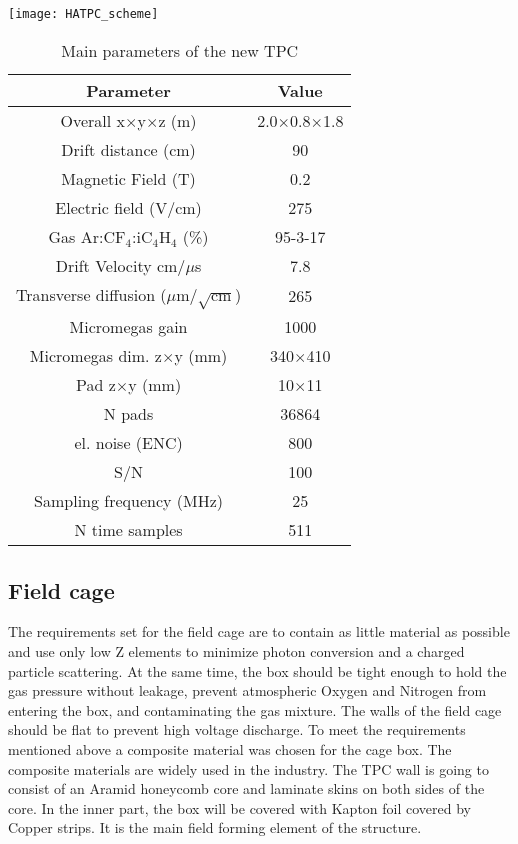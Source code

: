 \documentclass[../main.tex]{subfiles}
\begin{document}
\begin{table}
\begin{minipage}[!ht]{0.49\linewidth}
  \texttt{[image: HATPC\_scheme]}
  \label{fig:up:tpc_s}
\end{minipage}
\hfill
\begin{minipage}[!ht]{0.49\linewidth}
  \begin{tabular}{|c|c|}
    \hline
    Parameter             & Value \\
    \hline
    Overall x$\times$y$\times$z (m)   & 2.0$\times$0.8$\times$1.8 \\
    Drift distance (cm)               & 90 \\
    Magnetic Field (T)                & 0.2 \\
    Electric field (V/cm)             & 275 \\
    Gas $\text{Ar:CF}_4\text{:iC}_4\text{H}_4$ (\%)            & 95-3-17 \\
    Drift Velocity cm/$\mu$s          & 7.8 \\
    Transverse diffusion ($\mu$m/$\sqrt{\text{cm}}$) & 265 \\
    Micromegas gain                   & 1000 \\
    Micromegas dim. z$\times$y (mm)   & 340$\times$410 \\
    Pad z$\times$y (mm) & 10$\times$11 \\
    N pads                            & 36864 \\
    el. noise (ENC)                   & 800 \\
    S/N                               & 100 \\
    Sampling frequency (MHz)          & 25 \\
    N time samples                    & 511 \\
    \hline
  \end{tabular}
  \caption{Main parameters of the new TPC}
  \label{tbl:up:tpc_p}
\end{minipage}
\end{table}

\subsection{Field cage}
\label{sec:up:fc}
The requirements set for the field cage are to contain as little material as possible and use only low Z elements to minimize photon conversion and a charged particle scattering. At the same time, the box should be tight enough to hold the gas pressure without leakage, prevent atmospheric Oxygen and Nitrogen from entering the box, and contaminating the gas mixture. The walls of the field cage should be flat to prevent high voltage discharge. To meet the requirements mentioned above a composite material was chosen for the cage box. The composite materials are widely used in the industry. The TPC wall is going to consist of an Aramid honeycomb core and laminate skins on both sides of the core. In the inner part, the box will be covered with Kapton foil covered by Copper strips. It is the main field forming element of the structure.
\end{document}

